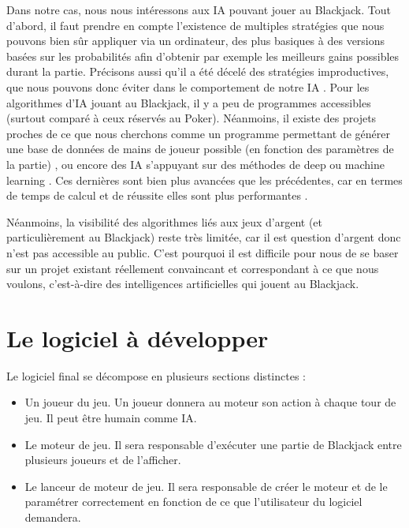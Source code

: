 Dans notre cas, nous nous intéressons aux IA pouvant jouer au Blackjack. Tout d’abord, il faut prendre en compte l'existence de multiples stratégies que nous pouvons bien sûr appliquer via un ordinateur, des plus basiques \cite{stratBasique} à des versions basées sur les probabilités \cite{blackjack_statistics} \cite{stratProba} afin d’obtenir par exemple les meilleurs gains possibles durant la partie. Précisons aussi qu’il a été décelé des stratégies improductives, que nous pouvons donc éviter dans le comportement de notre IA \cite{stratNull}.
Pour les algorithmes d’IA jouant au Blackjack, il y a peu de programmes accessibles (surtout comparé à ceux réservés au Poker). Néanmoins, il existe des projets proches de ce que nous cherchons comme un programme permettant de générer une base de données de mains de joueur possible (en fonction des paramètres de la partie) \cite{gitBJDataset}, ou encore des IA s’appuyant sur des méthodes de deep ou machine learning \cite{gitBJmachineLearning}. Ces dernières sont bien plus avancées que les précédentes, car en termes de temps de calcul et de réussite elles sont plus performantes  \cite{blogBJmachineLearning}. 

Néanmoins, la visibilité des algorithmes liés aux jeux d’argent (et particulièrement au Blackjack) reste très limitée, car il est question d’argent donc n’est pas accessible au public.
C’est pourquoi il est difficile pour nous de se baser sur un projet existant réellement convaincant et correspondant à ce que nous voulons, c’est-à-dire des intelligences artificielles qui jouent au Blackjack.

\section{Le logiciel à développer}

Le logiciel final se décompose en plusieurs sections distinctes : 
\begin{itemize}
    \item Un joueur du jeu. Un joueur donnera au moteur son action à chaque tour de jeu. Il peut être humain comme IA.
    \item Le moteur de jeu. Il sera responsable d'exécuter une partie de Blackjack entre plusieurs joueurs et de l'afficher.
    \item Le lanceur de moteur de jeu. Il sera responsable de créer le moteur et de le paramétrer correctement en fonction de ce que l'utilisateur du logiciel demandera.
\end{itemize}

